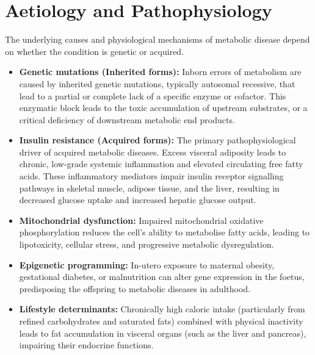 \section*{Aetiology and Pathophysiology}
The underlying causes and physiological mechanisms of metabolic disease depend on whether the condition is genetic or acquired.
\begin{itemize}
    \item \textbf{Genetic mutations (Inherited forms):} Inborn errors of metabolism are caused by inherited genetic mutations, typically autosomal recessive, that lead to a partial or complete lack of a specific enzyme or cofactor. This enzymatic block leads to the toxic accumulation of upstream substrates, or a critical deficiency of downstream metabolic end products.
    \item \textbf{Insulin resistance (Acquired forms):} The primary pathophysiological driver of acquired metabolic diseases. Excess visceral adiposity leads to chronic, low-grade systemic inflammation and elevated circulating free fatty acids. These inflammatory mediators impair insulin receptor signalling pathways in skeletal muscle, adipose tissue, and the liver, resulting in decreased glucose uptake and increased hepatic glucose output.
    \item \textbf{Mitochondrial dysfunction:} Impaired mitochondrial oxidative phosphorylation reduces the cell's ability to metabolise fatty acids, leading to lipotoxicity, cellular stress, and progressive metabolic dysregulation.
    \item \textbf{Epigenetic programming:} In-utero exposure to maternal obesity, gestational diabetes, or malnutrition can alter gene expression in the foetus, predisposing the offspring to metabolic diseases in adulthood.
    \item \textbf{Lifestyle determinants:} Chronically high caloric intake (particularly from refined carbohydrates and saturated fats) combined with physical inactivity leads to fat accumulation in visceral organs (such as the liver and pancreas), impairing their endocrine functions.
\end{itemize}

